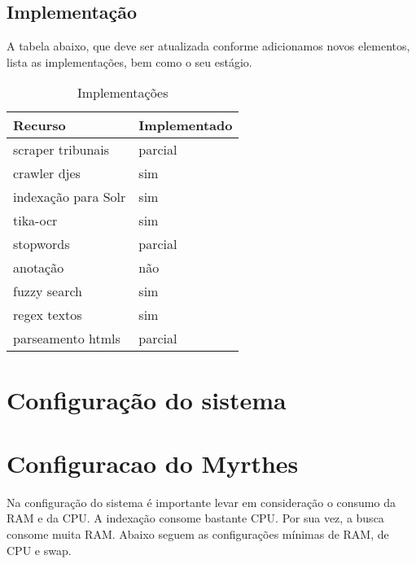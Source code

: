 \documentclass[]{book}
\begin{document}
\hypertarget{implementacao}{%
\section{Implementação}\label{implementacao}}

A tabela abaixo, que deve ser atualizada conforme adicionamos novos elementos, lista as implementações, bem como o seu estágio.

\begin{table}[t]

\caption{\label{tab:tab-imp}Implementações}
\centering
\begin{tabular}{ll}
\toprule
Recurso & Implementado\\
\midrule
scraper tribunais & parcial\\
crawler djes & sim\\
indexação para Solr & sim\\
tika-ocr & sim\\
stopwords & parcial\\
\addlinespace
anotação & não\\
fuzzy search & sim\\
regex textos & sim\\
parseamento htmls & parcial\\
\bottomrule
\end{tabular}
\end{table}

\hypertarget{section}{%
\section{}\label{section}}

\hypertarget{sysconf}{%
\chapter{Configuração do sistema}\label{sysconf}}

\hypertarget{section-1}{%
\section{}\label{section-1}}

\hypertarget{myrconf}{%
\chapter{Configuracao do Myrthes}\label{myrconf}}

Na configuração do sistema é importante levar em consideração o consumo da RAM e da CPU. A indexação consome bastante CPU. Por sua vez, a busca consome muita RAM. Abaixo seguem as configurações mínimas de RAM, de CPU e swap.
\end{document}

